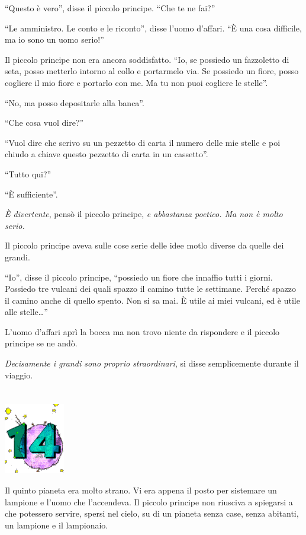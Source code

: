 \documentclass[11pt]{scrbook}
\begin{document}
``Questo è vero'', disse il piccolo principe. ``Che te ne fai?''

``Le amministro. Le conto e le riconto'', disse l'uomo d'affari. ``È una cosa difficile, ma io sono un uomo serio!''

Il piccolo principe non era ancora soddisfatto. ``Io, se possiedo un fazzoletto di seta, posso metterlo intorno al collo e portarmelo via. Se possiedo un fiore, posso cogliere il mio fiore e portarlo con me. Ma tu non puoi cogliere le stelle''.

``No, ma posso depositarle alla banca''.

``Che cosa vuol dire?''

``Vuol dire che scrivo su un pezzetto di carta il numero delle mie
stelle e poi chiudo a chiave questo pezzetto di carta in un cassetto''.

``Tutto qui?''

``È sufficiente''.

\emph{È divertente}, pensò il piccolo principe, \emph{e abbastanza poetico. Ma non è molto serio.}

Il piccolo principe aveva sulle cose serie delle idee motlo diverse da quelle dei grandi.

``Io'', disse il piccolo principe, ``possiedo un fiore che innaffio tutti i giorni. Possiedo tre vulcani dei quali spazzo il camino tutte le settimane. Perché spazzo il camino anche di quello spento. Non si sa mai. È utile ai miei vulcani, ed è utile alle stelle\ldots{}''

L'uomo d'affari aprì la bocca ma non trovo niente da rispondere e il piccolo principe se ne andò.

\emph{Decisamente i grandi sono proprio straordinari}, si disse semplicemente durante il viaggio.

\chapter{}
\begin{center}
\includegraphics{img/chapter14}
\end{center}

Il quinto pianeta era molto strano. Vi era appena il posto per sistemare un lampione e l'uomo che l'accendeva. Il piccolo principe non riusciva a spiegarsi a che potessero servire, spersi nel cielo, su di un pianeta senza case, senza abitanti, un lampione e il lampionaio.
\end{document}
